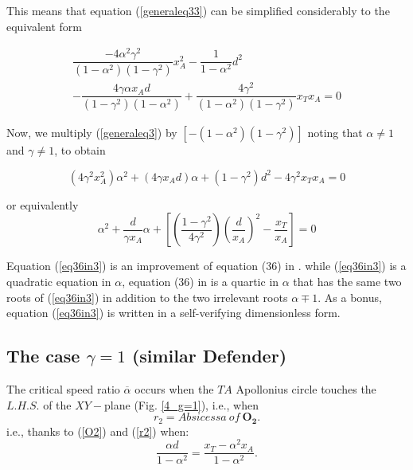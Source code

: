 \documentclass[final,5p,times,twocolumn]{elsarticle}
\begin{document}
This means that equation (\ref{generaleq33}) can be simplified considerably to the equivalent form

\begin{equation}
\begin{split}
\dfrac{-4 \alpha^{2}\gamma^{2}}{(1-\alpha^{2})(1-\gamma^{2})}x_{A}^{2}
-\dfrac{1}{1-\alpha^{2}}d^{2}\\
-\dfrac{4\gamma\alpha x_{A}d}{(1-\gamma^{2})(1-\alpha^{2})}
+\dfrac{4\gamma^{2}}{(1-\alpha^{2})(1-\gamma^{2})}x_{T}x_{A}=0
\end{split}
\label{generaleq3}
\end{equation}

Now, we multiply (\ref{generaleq3}) by $[-(1-\alpha^{2})(1-\gamma^{2})]$ noting that $\alpha\neq1$ and $\gamma\neq1$, to obtain

\begin{equation}
(4\gamma^{2}x_{A}^{2})\alpha^{2} + (4\gamma x_{A}d)\alpha + (1-\gamma^{2})d^{2} - 4\gamma^{2} x_{T} x_{A}=0
\label{generaleq4}
\end{equation}


or equivalently 
\begin{equation}
\boxed{
\alpha^{2}+\dfrac{d}{\gamma x_{A}}\alpha +[(\dfrac{1-\gamma^{2}}{4\gamma^{2}})(\dfrac{d}{x_{A}})^{2}-\dfrac{x_{T}}{x_{A}}]=0}
\label{eq36in3}
\end{equation}

Equation (\ref{eq36in3}) is an improvement of equation (36) in \cite{garcia2015escape}.
while (\ref{eq36in3}) is a quadratic equation in $\alpha$, equation (36) in \cite{garcia2015escape} is a quartic in $\alpha$ that has the same  two roots of (\ref{eq36in3}) in addition to the two irrelevant roots $\alpha\mp1$. As a bonus, equation (\ref{eq36in3}) is written in a self-verifying dimensionless form.

\subsection{The case $\gamma=1$ (similar Defender)}
The critical speed ratio $\overline{\alpha}$ occurs when the $TA$ Apollonius circle touches the $L.H.S.$ of the $XY-$plane (Fig. \ref{4_g=1}), i.e., when
\begin{equation}
r_{2}= Absicessa\ of\ \boldsymbol{O_{2}}.
\end{equation} 
i.e., thanks to (\ref{O2}) and (\ref{r2}) when:
\begin{equation}
\dfrac{\alpha d}{1-\alpha^{2}}=\dfrac{x_{T}-\alpha^{2}x_{A}}{1-\alpha^{2}}.
\label{case3}
\end{equation}
\end{document}

